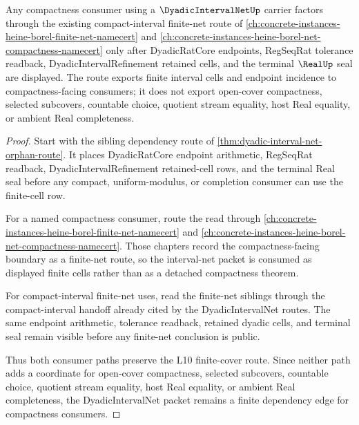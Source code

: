 \begin{theorem}
\label{thm:dyadic-interval-net-compactness-consumer-route}
Any compactness consumer using a $\DyadicIntervalNetUp$ carrier factors through the existing compact-interval finite-net route of \autoref{ch:concrete-instances-heine-borel-finite-net-namecert} and \autoref{ch:concrete-instances-heine-borel-net-compactness-namecert} only after DyadicRatCore endpoints, RegSeqRat tolerance readback, DyadicIntervalRefinement retained cells, and the terminal $\RealUp$ seal are displayed. The route exports finite interval cells and endpoint incidence to compactness-facing consumers; it does not export open-cover compactness, selected subcovers, countable choice, quotient stream equality, host Real equality, or ambient Real completeness.
\end{theorem}
\begin{proof}
Start with the sibling dependency route of \autoref{thm:dyadic-interval-net-orphan-route}. It places DyadicRatCore endpoint arithmetic, RegSeqRat readback, DyadicIntervalRefinement retained-cell rows, and the terminal Real seal before any compact, uniform-modulus, or completion consumer can use the finite-cell row.

For a named compactness consumer, route the read through \autoref{ch:concrete-instances-heine-borel-finite-net-namecert} and \autoref{ch:concrete-instances-heine-borel-net-compactness-namecert}. Those chapters record the compactness-facing boundary as a finite-net route, so the interval-net packet is consumed as displayed finite cells rather than as a detached compactness theorem.

For compact-interval finite-net uses, read the finite-net siblings through the compact-interval handoff already cited by the DyadicIntervalNet routes. The same endpoint arithmetic, tolerance readback, retained dyadic cells, and terminal seal remain visible before any finite-net conclusion is public.

Thus both consumer paths preserve the L10 finite-cover route. Since neither path adds a coordinate for open-cover compactness, selected subcovers, countable choice, quotient stream equality, host Real equality, or ambient Real completeness, the DyadicIntervalNet packet remains a finite dependency edge for compactness consumers.
\end{proof}
